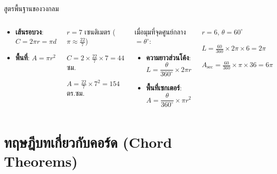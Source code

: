 \documentclass[11pt, aspectratio=169]{beamer}
\begin{document}
\begin{frame}{สูตรพื้นฐานของวงกลม}
  \begin{columns}[T]
      \begin{explanation}[เส้นรอบวงและพื้นที่]
        \begin{itemize}
          \item \textbf{เส้นรอบวง}: $C = 2\pi r = \pi d$
          \item \textbf{พื้นที่}: $A = \pi r^2$
        \end{itemize}
      \end{explanation}

      \begin{exambox}[ตัวอย่าง]
        $r = 7$ เซนติเมตร \quad ($\pi \approx \frac{22}{7}$)

        $C = 2 \times \frac{22}{7} \times 7 = 44$ ซม.

        $A = \frac{22}{7} \times 7^2 = 154$ ตร.ซม.
      \end{exambox}

      \begin{explanation}
        เมื่อมุมที่จุดศูนย์กลาง $= \theta^\circ$:
        \begin{itemize}
          \item \textbf{ความยาวส่วนโค้ง}: $L = \dfrac{\theta}{360^\circ} \times 2\pi r$
          \item \textbf{พื้นที่เซกเตอร์}: $A = \dfrac{\theta}{360^\circ} \times \pi r^2$
        \end{itemize}
      \end{explanation}

      \begin{exambox}[ตัวอย่าง]
        $r = 6$, $\theta = 60^\circ$

        $L = \frac{60}{360} \times 2\pi \times 6 = 2\pi$

        $A_{\text{sec}} = \frac{60}{360} \times \pi \times 36 = 6\pi$
      \end{exambox}
  \end{columns}
\end{frame}

\section{ทฤษฎีบทเกี่ยวกับคอร์ด (Chord Theorems)}
\end{document}
